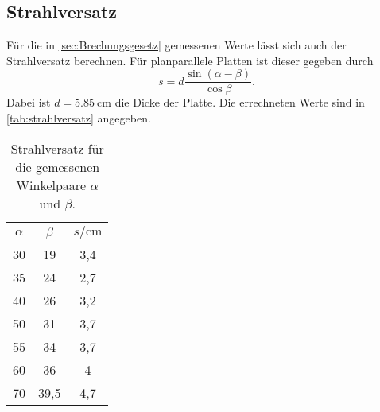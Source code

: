 \subsection{Strahlversatz}
\label{sec:Strahlversatz}
Für die in \autoref{sec:Brechungsgesetz} gemessenen Werte lässt sich auch der Strahlversatz
berechnen. Für planparallele Platten ist dieser gegeben durch
\begin{equation}
	s = d \frac{\sin(\alpha - \beta)}{\cos{\beta}}.
	\label{eqn:ausw:versatz}
\end{equation}
Dabei ist $d = \SI{5.85}{\centi\meter}$ die Dicke der Platte. Die errechneten Werte sind
in \autoref{tab:strahlversatz} angegeben.
\begin{table}
	\centering
	\caption{Strahlversatz für die gemessenen Winkelpaare $\alpha$ und $\beta$.}
	\label{tab:strahlversatz}
	\begin{tabular}{c c c}
		\toprule
		$\alpha$ &
		$\beta$ &
		$s / \si{\centi\meter}$ \\
		\midrule
		30 & 19   &  3,4	\\
		35 & 24   &  2,7	\\
		40 & 26   &  3,2	\\
		50 & 31   &  3,7	\\
		55 & 34   &  3,7	\\
		60 & 36   &  4	\\
		70 & 39,5 &  4,7	\\
		\bottomrule
	\end{tabular}
\end{table}

